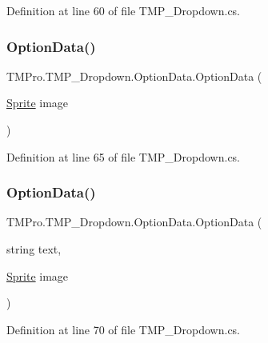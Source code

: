 Definition at line 60 of file T\+M\+P\+\_\+\+Dropdown.\+cs.

\mbox{\label{class_t_m_pro_1_1_t_m_p___dropdown_1_1_option_data_a4abb1db647c1397555934919b6cf7f20}} 
\subsubsection{\texorpdfstring{OptionData()}{OptionData()}\hspace{0.1cm}{\footnotesize\ttfamily [3/4]}}
{\footnotesize\ttfamily T\+M\+Pro.\+T\+M\+P\+\_\+\+Dropdown.\+Option\+Data.\+Option\+Data (\begin{DoxyParamCaption}\item[{\mbox{\hyperlink{namespace_t_m_pro_ab5662f47179bf1b81c575ecf80b24065a51f2b7b14433aa22c67d1f4fc18943cd}{Sprite}}}]{image }\end{DoxyParamCaption})}



Definition at line 65 of file T\+M\+P\+\_\+\+Dropdown.\+cs.

\mbox{\label{class_t_m_pro_1_1_t_m_p___dropdown_1_1_option_data_a5d5f10ea3ae4b29b4f13c88582cefcdf}} 
\subsubsection{\texorpdfstring{OptionData()}{OptionData()}\hspace{0.1cm}{\footnotesize\ttfamily [4/4]}}
{\footnotesize\ttfamily T\+M\+Pro.\+T\+M\+P\+\_\+\+Dropdown.\+Option\+Data.\+Option\+Data (\begin{DoxyParamCaption}\item[{string}]{text,  }\item[{\mbox{\hyperlink{namespace_t_m_pro_ab5662f47179bf1b81c575ecf80b24065a51f2b7b14433aa22c67d1f4fc18943cd}{Sprite}}}]{image }\end{DoxyParamCaption})}



Definition at line 70 of file T\+M\+P\+\_\+\+Dropdown.\+cs.



